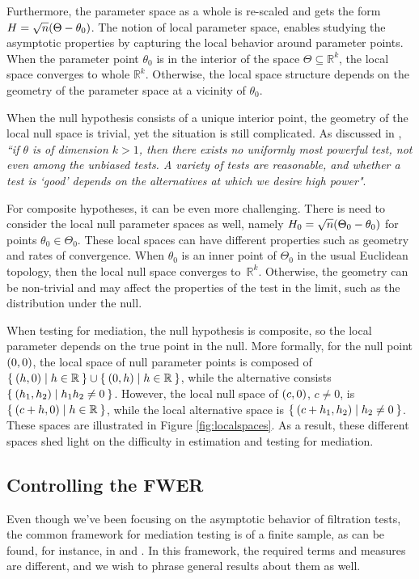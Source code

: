 \documentclass[ejs, twoside]{imsart}
\theoremstyle{plain}
\theoremstyle{remark}
\newcommand{\real}{\mathbb{R}}
\numberwithin{equation}{section}
\numberwithin{table}{section}
\numberwithin{figure}{section}
\let\originalleft\left
\let\originalright\right
\renewcommand{\left}{\mathopen{}\mathclose\bgroup\originalleft}
\renewcommand{\right}{\aftergroup\egroup\originalright}
\begin{document}
Furthermore, the parameter space as a whole is re-scaled and gets the form \(H = \sqrt{n}\left(\Theta - \theta_0 \right) \). The notion of local parameter space, enables studying the asymptotic properties by capturing the local behavior around parameter points. When the parameter point \(\theta_0\) is in the interior of the space \(\Theta \subseteq \real^k\), the local space converges to whole \(\real^k\). Otherwise, the local space structure depends on the geometry of the parameter space at a vicinity of \(\theta_0\). 

When the null hypothesis consists of a unique interior point, the geometry of the local null space is trivial, yet the situation is still complicated. As discussed in \citet[p.~217]{van_der_vaart_asymptotic_1998}, \textit{``if \(\theta\) is of dimension \(k>1\), then there exists no uniformly most powerful test, not even among the unbiased tests. A variety of tests are reasonable, and whether a test is `good' depends on the alternatives at which we desire high power"}.


For composite hypotheses, it can be even more challenging.
There is need to consider the local null parameter spaces as well, namely \(H_0 = \sqrt{n}\left(\Theta_0 - \theta_0 \right) \) for points \(\theta_0 \in \Theta_0\). These local spaces can have different properties such as geometry and rates of convergence. When \(\theta_0\) is an inner point of \(\Theta_0\) in the usual Euclidean topology, then the local null space converges to~\(\real^k\). Otherwise, the geometry can be non-trivial and may affect the properties of the test in the limit, such as the distribution under the null.


When testing for mediation, the null hypothesis is composite, so the local parameter depends on the true point in the null. More formally, for the null point \(\left( 0,0 \right) \), the local space of null parameter points is composed of \(\Set{\left(h, 0\right) | h \in \real} \cup \Set{\left(0, h\right) | h \in \real}\), while the alternative consists \(\Set{\left(h_1, h_2\right) | h_1 h_2 \neq 0}\).
However, the local null space of \(\left(c, 0 \right) \), \(c\neq 0\), is \(\Set{\left(c + h, 0\right) | h \in \real}\), while the local alternative space is \(\Set{\left(c + h_1, h_2\right) | h_2 \neq 0}\).
These spaces are illustrated in Figure \ref{fig:localspaces}.
As a result, these different spaces shed light on the difficulty in estimation and testing for mediation.


\subsection{Controlling the FWER}
Even though we've been focusing on the asymptotic behavior of filtration tests, the common framework for mediation testing is of a finite sample, as can be found, for instance, in \citet{boca_testing_2014} and \citet{djordjilovic_optimal_2020}. In this framework, the required terms and measures are different, and we wish to phrase general results about them as well.
\end{document}
